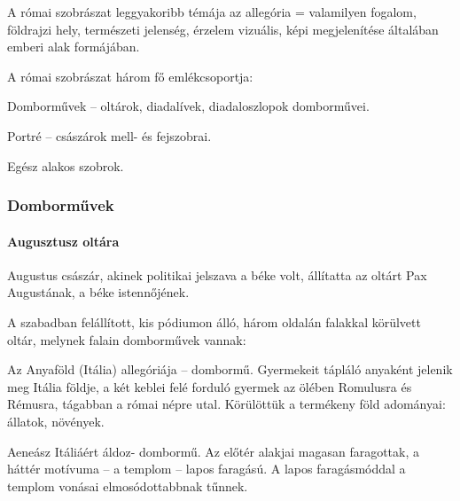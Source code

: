 A római szobrászat leggyakoribb témája az allegória = valamilyen fogalom, földrajzi hely, természeti jelenség, érzelem vizuális, képi megjelenítése általában emberi alak formájában.

A római szobrászat három fő emlékcsoportja:
\begin{compactitem}
	\item Domborművek – oltárok, diadalívek, diadaloszlopok domborművei.
	\item Portré – császárok mell- és fejszobrai.
	\item Egész alakos szobrok.
\end{compactitem}


\subsubsection{Domborművek}

	\paragraph{Augusztusz oltára}
	Augustus császár, akinek politikai jelszava a béke volt, állítatta az oltárt Pax Augustának, a béke istennőjének.
	
	A szabadban felállított, kis pódiumon álló, három oldalán falakkal körülvett oltár, melynek falain domborművek vannak:
	\begin{compactitem}
		\item Az Anyaföld (Itália) allegóriája – dombormű. Gyermekeit tápláló anyaként jelenik meg Itália földje, a két keblei felé forduló gyermek az ölében Romulusra és Rémusra, tágabban a római népre utal. Körülöttük a termékeny föld adományai: állatok, növények.
		
		\item Aeneász Itáliáért áldoz- dombormű. Az előtér alakjai magasan faragottak, a háttér motívuma – a templom – lapos faragású. A lapos faragásmóddal a templom vonásai elmosódottabbnak tűnnek.
	\end{compactitem}

\begin{figure}[H]
	\begin{minipage}{0.32\textwidth}
	\end{minipage}
	\hfill
	\begin{minipage}{0.29\textwidth}
	\end{minipage}
	\hfill
	\begin{minipage}{0.32\textwidth}
	\end{minipage}		
\end{figure}
	

